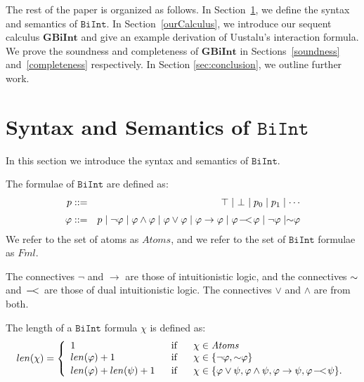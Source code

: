 \documentclass{llncs}
\numberwithin{equation}{section}
\newcommand{\Lg}[1]{\mathtt{#1}}
\newcommand{\ExAnd}{\wedge}
\newcommand{\ExOr}{\vee}
\newcommand{\ExNot}{\neg}
\newcommand{\ExImp}{\rightarrow}
\newcommand{\Fml}{\mathit{Fml}}
\newcommand{\Atoms}{\mathit{Atoms}}
\newcommand{\WeakImp}{
\begin{picture}(10,10)
     \put(1,0){$-$}
     \put(7,0){$<$}
   \end{picture}
   \;\; 
}
\newcommand{\WeakNot}{\sim \hspace{-0.1cm}}
\newcommand{\Bottom}{\perp}
\newcommand{\Top}{\top}
\newcommand {\BiInt}{
        \Lg{BiInt}
}
\newcommand{\GBiInt}{\mathbf{GBiInt}}
\begin{document}
The rest of the paper is organized as follows. In Section~\ref{syntaxSemantics}, we define the syntax and semantics
of $\BiInt$.  In Section~\ref{ourCalculus}, we introduce our sequent calculus $\GBiInt$ and give an example derivation of Uustalu's interaction formula. We prove the soundness and completeness of $\GBiInt$ in Sections~\ref{soundness}
and~\ref{completeness} respectively.  In Section \ref{sec:conclusion}, we outline further work.

\section{Syntax and Semantics of $\BiInt$}\label{syntaxSemantics}

In this section we introduce the syntax and semantics of $\BiInt$.

\begin{definition}[Syntax]
The formulae of $\BiInt$ are defined as:
\begin{eqnarray}
  p & ::= & \Top \mid \ \Bottom \ \mid p_0 \mid p_1 \mid \cdots  \\
  \varphi & ::= & p \mid \ExNot \varphi 
               \mid \varphi \ExAnd \varphi 
               \mid \varphi \ExOr \varphi 
               \mid \varphi \ExImp \varphi 
               \mid \varphi \WeakImp \varphi 
               \mid \ExNot \varphi
               \mid \WeakNot \varphi
\end{eqnarray}
We refer to the set of atoms as $\Atoms$, and we refer to the set of $\BiInt$ formulae as $\Fml$.
\end{definition}

The connectives $\ExNot$ and $\ExImp$ are those of intuitionistic logic, and the connectives $\WeakNot$ and $\WeakImp$ are those of dual intuitionistic logic. The connectives $\ExOr$ and $\ExAnd$ are from both.

\begin{definition}[Length]
The length of a $\BiInt$ formula $\chi$ is defined as:
$$
len(\chi) = 
\left\{
\begin{array}{lcl}
	1																				&	\ \text{ if } \ & \chi \in \Atoms \\
	len(\varphi) + 1											&	\ \text{ if } \ & \chi \in \{ \ExNot \varphi, \WeakNot \varphi \} \\
	len(\varphi) + len(\psi) + 1			&	\ \text{ if } \ & \chi \in \{ \varphi \ExOr \psi, \varphi \ExAnd \psi, \varphi \ExImp \psi, \varphi \WeakImp \psi \} .
\\
\end{array}
\right.		
$$
\end{definition}
\end{document}
